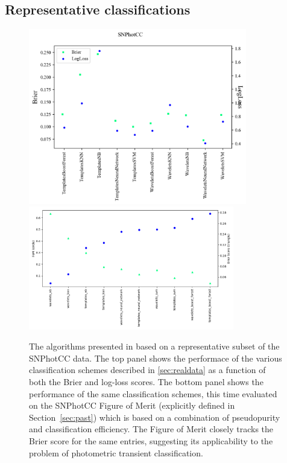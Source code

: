 \subsection{Representative classifications}
\label{sec:realresults}

\begin{figure}
	\begin{center}
		\includegraphics[width=0.85\textwidth]{./fig/SNPhotCC_res.png}\\
		 \includegraphics[width=0.8\textwidth]{./fig/fom_vs_brier.png}
		\caption{The algorithms presented in \cite{lochner_photometric_2016} based on a representative subset of the SNPhotCC data. The top panel shows the performace of the various classification schemes described in \ref{sec:realdata} as a function of both the Brier and log-loss scores. The bottom panel shows the performance of the same classification schemes, this time evaluated on the SNPhotCC Figure of Merit (explicitly defined in Section~\ref{sec:past}) which is based on a combination of pseudopurity and classification efficiency. The Figure of Merit closely tracks the Brier score for the same entries, suggesting its applicability to the problem of photometric transient classification.
		\label{fig:real_metric_compare}}
	\end{center}
\end{figure}

